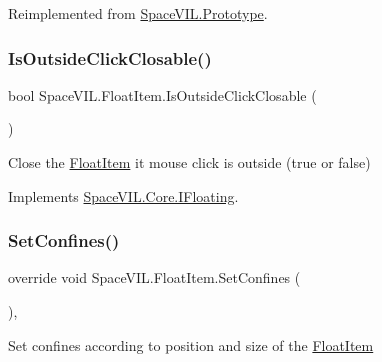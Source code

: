 Reimplemented from \mbox{\hyperlink{class_space_v_i_l_1_1_prototype_ac3379fe02923ee155b5b0084abf27420}{Space\+V\+I\+L.\+Prototype}}.

\mbox{\label{class_space_v_i_l_1_1_float_item_a491aaaddc768c4676ecfb5c7405ec167}} 
\subsubsection{\texorpdfstring{Is\+Outside\+Click\+Closable()}{IsOutsideClickClosable()}}
{\footnotesize\ttfamily bool Space\+V\+I\+L.\+Float\+Item.\+Is\+Outside\+Click\+Closable (\begin{DoxyParamCaption}{ }\end{DoxyParamCaption})\hspace{0.3cm}{\ttfamily [inline]}}



Close the \mbox{\hyperlink{class_space_v_i_l_1_1_float_item}{Float\+Item}} it mouse click is outside (true or false) 



Implements \mbox{\hyperlink{interface_space_v_i_l_1_1_core_1_1_i_floating}{Space\+V\+I\+L.\+Core.\+I\+Floating}}.

\mbox{\label{class_space_v_i_l_1_1_float_item_ada12a95045db04f1a5e196a14f1a8d0f}} 
\subsubsection{\texorpdfstring{Set\+Confines()}{SetConfines()}}
{\footnotesize\ttfamily override void Space\+V\+I\+L.\+Float\+Item.\+Set\+Confines (\begin{DoxyParamCaption}{ }\end{DoxyParamCaption})\hspace{0.3cm}{\ttfamily [inline]}, {\ttfamily [virtual]}}



Set confines according to position and size of the \mbox{\hyperlink{class_space_v_i_l_1_1_float_item}{Float\+Item}} 



